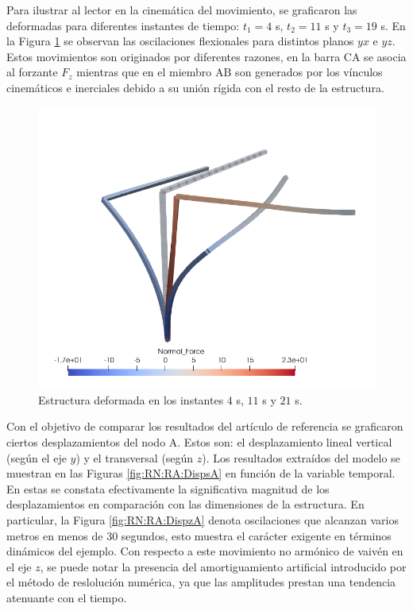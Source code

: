 Para ilustrar al lector en la cinemática del movimiento, se graficaron las deformadas para diferentes instantes de tiempo: $t_1=4$ s, $t_2=11$ s y $t_3=19$ s. En la Figura \ref{fig:RN:RA:Deformadas} se observan las oscilaciones flexionales para distintos planos $yx$ e $yz$. Estos movimientos son originados por diferentes razones, en la barra $\text{CA}$ se asocia al forzante $F_z$ mientras que en el miembro $\text{AB}$ son generados por los vínculos cinemáticos e inerciales debido a su unión rígida con el resto de la estructura.

\begin{figure}[htbp]
	\centering
	\includegraphics[width=120mm]{./imagenes/ResultadosNumericos/RightAngeCantilever/Deformadas.png}
	\caption{Estructura deformada en los instantes $4$ s, $11$ s y $21$ s.}
	\label{fig:RN:RA:Deformadas}
\end{figure}

Con el objetivo de comparar los resultados del artículo de referencia se graficaron ciertos desplazamientos del nodo A. Estos son: el desplazamiento lineal vertical (según el eje $y$) y el transversal (según $z$). Los resultados extraídos del modelo se muestran en las Figuras \ref{fig:RN:RA:DispsA} en función de la variable temporal. En estas se constata efectivamente la significativa magnitud de los desplazamientos en comparación con las dimensiones de la estructura. En particular, la Figura \ref{fig:RN:RA:DispzA} denota oscilaciones que alcanzan varios metros en menos de 30 segundos, esto muestra el carácter exigente en términos dinámicos del ejemplo. Con respecto a este movimiento no armónico  de vaivén en el eje $z$, se puede notar la presencia del amortiguamiento artificial introducido por el método de reslolución numérica, ya que las amplitudes prestan una tendencia atenuante con el tiempo.  

